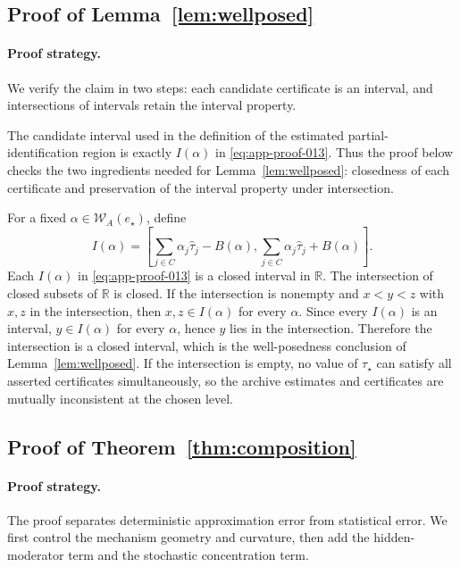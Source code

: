 \documentclass[11pt]{article}
\numberwithin{equation}{section}
\newcommand{\R}{\mathbb R}
\newcommand{\1}{\mathbf 1}
\newcommand{\cW}{\mathcal W}
\begin{document}
\subsection{Proof of Lemma~\ref{lem:wellposed}}
\label{app:proof-lem-wellposed}

\paragraph{Proof strategy.} We verify the claim in two steps: each candidate certificate is an interval, and intersections of intervals retain the interval property.

The candidate interval used in the definition of the estimated
partial-identification region is exactly \(I(\alpha)\) in
\eqref{eq:app-proof-013}.  Thus the proof below checks the two ingredients
needed for Lemma~\ref{lem:wellposed}: closedness of each certificate and
preservation of the interval property under intersection.

For a fixed \(\alpha\in\cW_A(e_\star)\), define
\begin{equation}
\label{eq:app-proof-013}
I(\alpha)=
  \left[
  \sum_{j\in C}\alpha_j\widehat\tau_j-B(\alpha),
  \sum_{j\in C}\alpha_j\widehat\tau_j+B(\alpha)
  \right].
\end{equation}
Each \(I(\alpha)\) in \eqref{eq:app-proof-013} is a closed interval in
\(\R\).  The intersection of closed subsets of \(\R\) is closed.  If the
intersection is nonempty and \(x<y<z\) with \(x,z\) in the intersection,
then \(x,z\in I(\alpha)\) for every \(\alpha\).  Since every
\(I(\alpha)\) is an interval, \(y\in I(\alpha)\) for every \(\alpha\),
hence \(y\) lies in the intersection.  Therefore the intersection is a
closed interval, which is the well-posedness conclusion of
Lemma~\ref{lem:wellposed}.  If the intersection is empty, no value of
\(\tau_\star\) can satisfy all asserted certificates simultaneously, so the
archive estimates and certificates are mutually inconsistent at the chosen
level.

\subsection{Proof of Theorem~\ref{thm:composition}}
\label{app:proof-thm-composition}

\paragraph{Proof strategy.} The proof separates deterministic approximation error from statistical error.  We first control the mechanism geometry and curvature, then add the hidden-moderator term and the stochastic concentration term.
\end{document}
